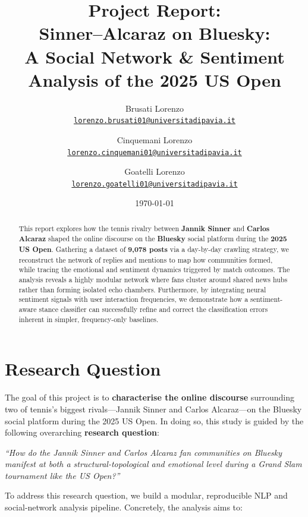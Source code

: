 \documentclass[12pt,a4paper]{article}
\title{\textbf{Project Report}: \\ Sinner--Alcaraz on Bluesky:\\ A Social Network \& Sentiment Analysis of the 2025 US Open}
\author{%
  Brusati Lorenzo \\
  \small \href{mailto:lorenzo.brusati01@universitadipavia.it}{\texttt{lorenzo.brusati01@universitadipavia.it}}%
  \and
  Cinquemani Lorenzo \\
  \small \href{mailto:lorenzo.cinquemani01@universitadipavia.it}{\texttt{lorenzo.cinquemani01@universitadipavia.it}}%
  \and
  Goatelli Lorenzo \\
  \small \href{mailto:lorenzo.goatelli01@universitadipavia.it}{\texttt{lorenzo.goatelli01@universitadipavia.it}}%
}
\date{\today}
\begin{document}
\maketitle

\begin{abstract}
This report explores how the tennis rivalry between \textbf{Jannik Sinner} and \textbf{Carlos Alcaraz} shaped the online discourse on the \textbf{Bluesky} social platform during the \textbf{2025 US Open}. Gathering a dataset of \textbf{9{,}078 posts} via a day-by-day crawling strategy, we reconstruct the network of replies and mentions to map how communities formed, while tracing the emotional and sentiment dynamics triggered by match outcomes. The analysis reveals a highly modular network where fans cluster around shared news hubs rather than forming isolated echo chambers. Furthermore, by integrating neural sentiment signals with user interaction frequencies, we demonstrate how a sentiment-aware stance classifier can successfully refine and correct the classification errors inherent in simpler, frequency-only baselines.

\end{abstract}

\newpage

\tableofcontents

\newpage

\section{Research Question}

The goal of this project is to \textbf{characterise the online discourse} surrounding two of
tennis's biggest rivals---Jannik Sinner and Carlos Alcaraz---on the Bluesky social platform
during the 2025 US Open. In doing so, this study is guided by the following overarching \textbf{research question}:

\begin{center}
    \vspace{0.8cm}
    \large
    \textit{``How do the Jannik Sinner and Carlos Alcaraz fan communities on Bluesky manifest at both a structural-topological and emotional level during a Grand Slam tournament like the US Open?''}
    \vspace{0.8cm}
\end{center}

To address this research question, we build a modular, reproducible NLP and social-network analysis pipeline. Concretely, the analysis aims to:
\end{document}
